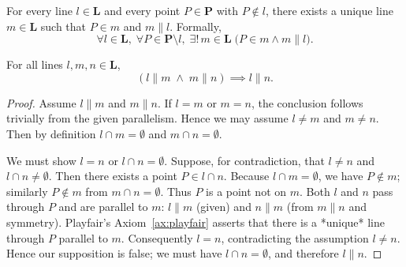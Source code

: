 \documentclass[../../../main/main.tex]{subfiles}
\begin{document}
\begin{axiom}\label{ax:playfair}
    For every line $l \in \mathbf{L}$ and every point $P \in \mathbf{P}$ with $P \notin l$,
    there exists a unique line $m \in \mathbf{L}$ such that $P \in m$ and $m \parallel l$.
    Formally,
    \[
    \forall l\in\mathbf{L},\; \forall P\in\mathbf{P}\setminus l,\;
    \exists!\, m\in\mathbf{L}\; \bigl( P\in m \land m\parallel l \bigr).
    \]
\end{axiom}

\begin{theorem}\label{thm:par-trans}
  For all lines $l,m,n\in\mathbf{L}$,
  \[
  (l \parallel m \;\land\; m \parallel n) \implies l \parallel n.
  \]
\end{theorem}
\begin{proof}
    Assume $l \parallel m$ and $m \parallel n$.
    If $l=m$ or $m=n$, the conclusion follows trivially from the given parallelism.
    Hence we may assume $l \neq m$ and $m \neq n$.
    Then by definition $l \cap m = \emptyset$ and $m \cap n = \emptyset$.

    We must show $l = n$ or $l \cap n = \emptyset$.
    Suppose, for contradiction, that $l \neq n$ and $l \cap n \neq \emptyset$.
    Then there exists a point $P \in l \cap n$.
    Because $l \cap m = \emptyset$, we have $P \notin m$; similarly $P \notin m$ from
    $m \cap n = \emptyset$.  Thus $P$ is a point not on $m$.
    Both $l$ and $n$ pass through $P$ and are parallel to $m$:
    $l \parallel m$ (given) and $n \parallel m$ (from $m \parallel n$ and symmetry).
    Playfair's Axiom~\ref{ax:playfair} asserts that there is a *unique* line through $P$
    parallel to $m$.  Consequently $l = n$, contradicting the assumption $l \neq n$.
    Hence our supposition is false; we must have $l \cap n = \emptyset$, and therefore
    $l \parallel n$.
\end{proof}
\end{document}
